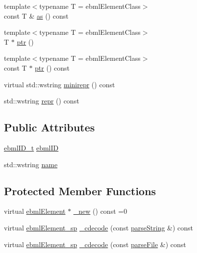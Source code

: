 \begin{DoxyCompactItemize}
\item 
{\footnotesize template$<$typename T  = ebml\+Element\+Class$>$ }\\const T \& \mbox{\hyperlink{classebml_1_1ebmlElementClass_a5d49c645d8b92ef330e5960a02f2fbf7}{as}} () const
\item 
{\footnotesize template$<$typename T  = ebml\+Element\+Class$>$ }\\T $\ast$ \mbox{\hyperlink{classebml_1_1ebmlElementClass_a485c3f4a11b09d301b80f44e1802e9ab}{ptr}} ()
\item 
{\footnotesize template$<$typename T  = ebml\+Element\+Class$>$ }\\const T $\ast$ \mbox{\hyperlink{classebml_1_1ebmlElementClass_a4d3188e97ab01f1db0427faa5b5d6059}{ptr}} () const
\item 
virtual std\+::wstring \mbox{\hyperlink{classebml_1_1ebmlElementClass_a251cc751901423a86099d58d49f28291}{minirepr}} () const
\item 
std\+::wstring \mbox{\hyperlink{classebml_1_1ebmlElementClass_a117d6f78c2bdaa4dbf02cab30510d8f5}{repr}} () const
\end{DoxyCompactItemize}
\subsection*{Public Attributes}
\begin{DoxyCompactItemize}
\item 
\mbox{\hyperlink{namespaceebml_a86c5f604ddf12a74aa9812e997a58691}{ebml\+I\+D\+\_\+t}} \mbox{\hyperlink{classebml_1_1ebmlElementClass_a7d8337c9f9b884b43e1618b9392519b6}{ebml\+ID}}
\item 
std\+::wstring \mbox{\hyperlink{classebml_1_1ebmlElementClass_aba4096c056179fb989da05d86f4cb46d}{name}}
\end{DoxyCompactItemize}
\subsection*{Protected Member Functions}
\begin{DoxyCompactItemize}
\item 
virtual \mbox{\hyperlink{classebml_1_1ebmlElement}{ebml\+Element}} $\ast$ \mbox{\hyperlink{classebml_1_1ebmlElementClass_a223ede6b8bc3c85251d2d73f0256fb45}{\+\_\+new}} () const =0
\item 
virtual \mbox{\hyperlink{namespaceebml_adad533b7705a16bb360fe56380c5e7be}{ebml\+Element\+\_\+sp}} \mbox{\hyperlink{classebml_1_1ebmlElementClass_a81f0713cca953599d74185aa24c4c2c1}{\+\_\+cdecode}} (const \mbox{\hyperlink{classebml_1_1parseString}{parse\+String}} \&) const
\item 
virtual \mbox{\hyperlink{namespaceebml_adad533b7705a16bb360fe56380c5e7be}{ebml\+Element\+\_\+sp}} \mbox{\hyperlink{classebml_1_1ebmlElementClass_ae423476637d4ca052cd7aa0047f2b3eb}{\+\_\+cdecode}} (const \mbox{\hyperlink{classebml_1_1parseFile}{parse\+File}} \&) const
\end{DoxyCompactItemize}
